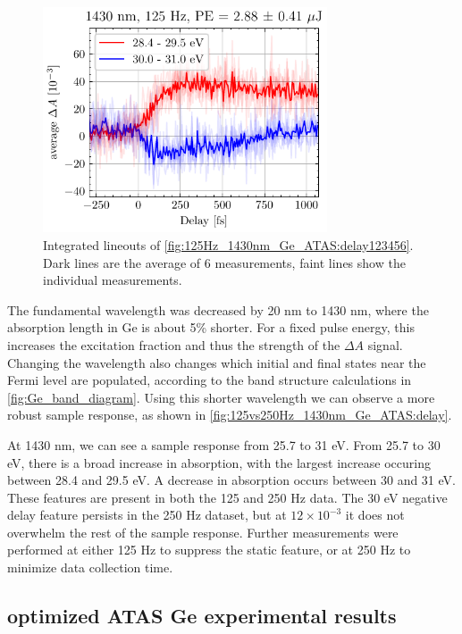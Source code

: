 \begin{figure}
	\centering
	\includegraphics[width=0.75\textwidth]{figures/chap4/Delay123456_1430nm_125Hz_2p88uJ_AvgBands.pdf}
	\caption{Integrated lineouts of \cref{fig:125Hz_1430nm_Ge_ATAS:delay123456}. Dark lines are the average of 6 measurements, faint lines show the individual measurements.}
	\label{fig:Delay123456_1430nm_125Hz_2p88uJ_AvgBands}
\end{figure}

The fundamental wavelength was decreased by 20 nm to 1430 nm, where the absorption length in Ge is about 5\% shorter. For a fixed pulse energy, this increases the excitation fraction and thus the strength of the $\Delta A$ signal. Changing the wavelength also changes which initial and final states near the Fermi level are populated, according to the band structure calculations in \cref{fig:Ge_band_diagram}. Using this shorter wavelength we can observe a more robust sample response, as shown in \cref{fig:125vs250Hz_1430nm_Ge_ATAS:delay}.

At 1430 nm, we can see a sample response from 25.7 to 31 eV. From 25.7 to 30 eV, there is a broad increase in absorption, with the largest increase occuring between 28.4 and 29.5 eV. A decrease in absorption occurs between 30 and 31 eV. These features are present in both the 125 and 250 Hz data. The 30 eV negative delay feature persists in the 250 Hz dataset, but at $12 \times 10^{-3}$ it does not overwhelm the rest of the sample response. Further measurements were performed at either 125 Hz to suppress the static feature, or at 250 Hz to minimize data collection time.


\subsection{optimized ATAS Ge experimental results}

